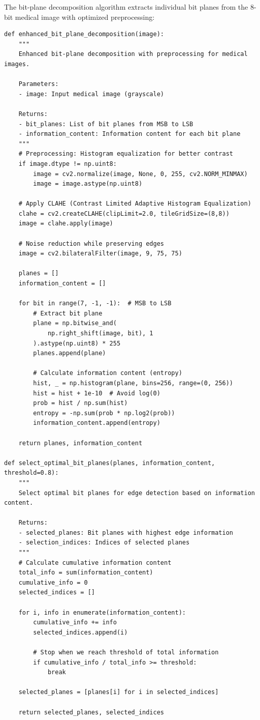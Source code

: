 \documentclass[conference]{IEEEtran}
\begin{document}
The bit-plane decomposition algorithm extracts individual bit planes from the 8-bit medical image with optimized preprocessing:

\begin{lstlisting}[caption={Enhanced bit-plane decomposition with preprocessing}]
def enhanced_bit_plane_decomposition(image):
    """
    Enhanced bit-plane decomposition with preprocessing for medical images.
    
    Parameters:
    - image: Input medical image (grayscale)
    
    Returns:
    - bit_planes: List of bit planes from MSB to LSB
    - information_content: Information content for each bit plane
    """
    # Preprocessing: Histogram equalization for better contrast
    if image.dtype != np.uint8:
        image = cv2.normalize(image, None, 0, 255, cv2.NORM_MINMAX)
        image = image.astype(np.uint8)
    
    # Apply CLAHE (Contrast Limited Adaptive Histogram Equalization)
    clahe = cv2.createCLAHE(clipLimit=2.0, tileGridSize=(8,8))
    image = clahe.apply(image)
    
    # Noise reduction while preserving edges
    image = cv2.bilateralFilter(image, 9, 75, 75)
    
    planes = []
    information_content = []
    
    for bit in range(7, -1, -1):  # MSB to LSB
        # Extract bit plane
        plane = np.bitwise_and(
            np.right_shift(image, bit), 1
        ).astype(np.uint8) * 255
        planes.append(plane)
        
        # Calculate information content (entropy)
        hist, _ = np.histogram(plane, bins=256, range=(0, 256))
        hist = hist + 1e-10  # Avoid log(0)
        prob = hist / np.sum(hist)
        entropy = -np.sum(prob * np.log2(prob))
        information_content.append(entropy)
    
    return planes, information_content

def select_optimal_bit_planes(planes, information_content, threshold=0.8):
    """
    Select optimal bit planes for edge detection based on information content.
    
    Returns:
    - selected_planes: Bit planes with highest edge information
    - selection_indices: Indices of selected planes
    """
    # Calculate cumulative information content
    total_info = sum(information_content)
    cumulative_info = 0
    selected_indices = []
    
    for i, info in enumerate(information_content):
        cumulative_info += info
        selected_indices.append(i)
        
        # Stop when we reach threshold of total information
        if cumulative_info / total_info >= threshold:
            break
    
    selected_planes = [planes[i] for i in selected_indices]
    
    return selected_planes, selected_indices
\end{lstlisting}
\end{document}
